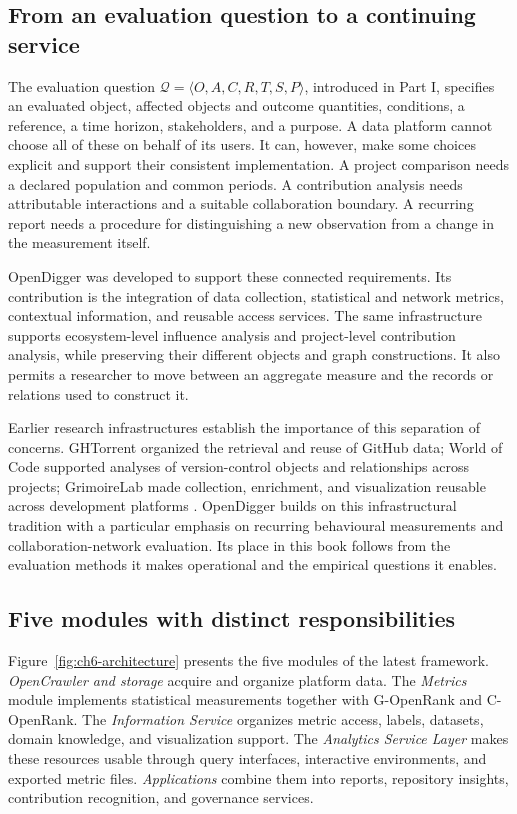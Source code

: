 \subsection{From an evaluation question to a continuing service}
The evaluation question \(\mathcal Q=\langle O,A,C,R,T,S,P\rangle\), introduced in Part I, specifies an evaluated object, affected objects and outcome quantities, conditions, a reference, a time horizon, stakeholders, and a purpose. A data platform cannot choose all of these on behalf of its users. It can, however, make some choices explicit and support their consistent implementation. A project comparison needs a declared population and common periods. A contribution analysis needs attributable interactions and a suitable collaboration boundary. A recurring report needs a procedure for distinguishing a new observation from a change in the measurement itself.

OpenDigger was developed to support these connected requirements. Its contribution is the integration of data collection, statistical and network metrics, contextual information, and reusable access services. The same infrastructure supports ecosystem-level influence analysis and project-level contribution analysis, while preserving their different objects and graph constructions. It also permits a researcher to move between an aggregate measure and the records or relations used to construct it.

Earlier research infrastructures establish the importance of this separation of concerns. GHTorrent organized the retrieval and reuse of GitHub data; World of Code supported analyses of version-control objects and relationships across projects; GrimoireLab made collection, enrichment, and visualization reusable across development platforms \citep{gousios2012,ma2019,duenas2021}. OpenDigger builds on this infrastructural tradition with a particular emphasis on recurring behavioural measurements and collaboration-network evaluation. Its place in this book follows from the evaluation methods it makes operational and the empirical questions it enables.

\subsection{Five modules with distinct responsibilities}
Figure~\ref{fig:ch6-architecture} presents the five modules of the latest framework. \emph{OpenCrawler and storage} acquire and organize platform data. The \emph{Metrics} module implements statistical measurements together with G-OpenRank and C-OpenRank. The \emph{Information Service} organizes metric access, labels, datasets, domain knowledge, and visualization support. The \emph{Analytics Service Layer} makes these resources usable through query interfaces, interactive environments, and exported metric files. \emph{Applications} combine them into reports, repository insights, contribution recognition, and governance services.


